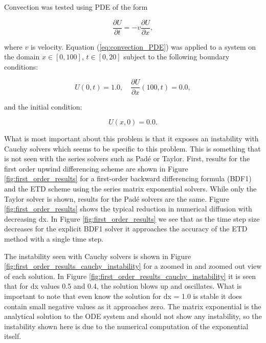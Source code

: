 Convection was tested using PDE of the form

\begin{equation}
    \frac{\partial U}{\partial t} = -v\frac{\partial U}{\partial x},
    \label{eq:convection_PDE}
\end{equation}

\noindent where $v$ is velocity. Equation (\ref{eq:convection_PDE}) was applied to a system on the domain $x \in [0, 100]$, $t \in [0, 20]$ subject to the following boundary conditions:

\begin{equation}
    U(0,t) = 1.0, \quad\frac{\partial U}{\partial x}(100, t) = 0.0,
\end{equation}

\noindent and the initial condition:

\begin{equation}
    U(x,0) = 0.0.
\end{equation}

What is most important about this problem is that it exposes an instability with Cauchy solvers which seems to be specific to this problem. This is something that is not seen with the series solvers such as Pad\'e or Taylor. First, results for the first order upwind differencing scheme are shown in Figure \ref{fig:first_order_results}  for a first-order backward differencing formula (BDF1) and the ETD scheme using the series matrix exponential solvers. While only the Taylor solver is shown, results for the Pad\'e solvers are the same. Figure \ref{fig:first_order_results} shows the typical reduction in numerical diffusion with decreasing dx. In Figure \ref{fig:first_order_results} we see that as the time step size decreases for the explicit BDF1 solver it approaches the accuracy of the ETD method with a single time step. 

The instability seen with Cauchy solvers is shown in Figure \ref{fig:first_order_results_cauchy_instability} for a zoomed in and zoomed out view of each solution. In Figure \ref{fig:first_order_results_cauchy_instability} it is seen that for dx values 0.5 and 0.4, the solution blows up and oscillates. What is important to note that even know the solution for dx = 1.0 is stable it does contain small negative values as it approaches zero. The matrix exponential is the analytical solution to the ODE system and should not show any instability, so the instability shown here is due to the numerical computation of the exponential itself. 

\clearpage

